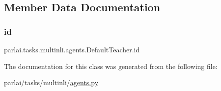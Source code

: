 \subsection{Member Data Documentation}
\mbox{\label{classparlai_1_1tasks_1_1multinli_1_1agents_1_1DefaultTeacher_a2eacc99d6289f9184e166de045beeade}} 
\subsubsection{\texorpdfstring{id}{id}}
{\footnotesize\ttfamily parlai.\+tasks.\+multinli.\+agents.\+Default\+Teacher.\+id}



The documentation for this class was generated from the following file\+:\begin{DoxyCompactItemize}
\item 
parlai/tasks/multinli/\hyperlink{parlai_2tasks_2multinli_2agents_8py}{agents.\+py}\end{DoxyCompactItemize}
